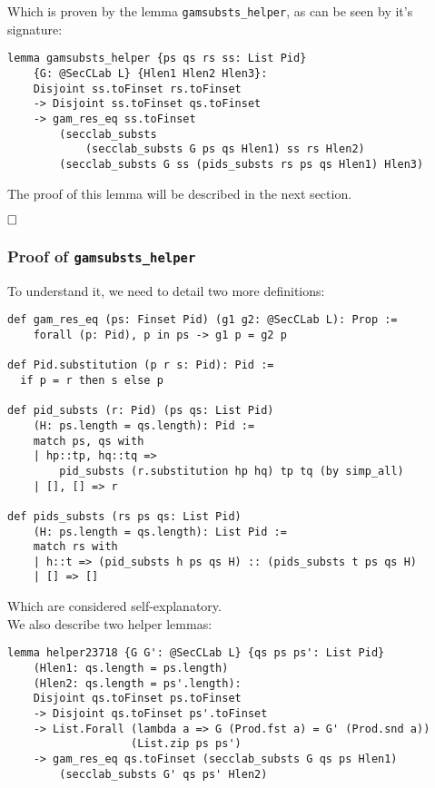 \documentclass[12pt,a4paper,twoside]{book}
\newcommand{\qed}{\hfill\square}
\begin{document}
\begin{itemize}
Which is proven by the lemma \texttt{gamsubsts\_helper}, as can be seen by it's signature:
\begin{samepage}
\begin{verbatim}
lemma gamsubsts_helper {ps qs rs ss: List Pid}
    {G: @SecCLab L} {Hlen1 Hlen2 Hlen3}:
    Disjoint ss.toFinset rs.toFinset
    -> Disjoint ss.toFinset qs.toFinset
    -> gam_res_eq ss.toFinset
        (secclab_substs
            (secclab_substs G ps qs Hlen1) ss rs Hlen2)
        (secclab_substs G ss (pids_substs rs ps qs Hlen1) Hlen3)
\end{verbatim}
\end{samepage}
The proof of this lemma will be described in the next section.
\end{itemize}
$\qed$

\subsubsection{Proof of \texttt{gamsubsts\_helper}}
To understand it, we need to detail two more definitions:
\begin{samepage}
\begin{verbatim}
def gam_res_eq (ps: Finset Pid) (g1 g2: @SecCLab L): Prop :=
    forall (p: Pid), p in ps -> g1 p = g2 p

def Pid.substitution (p r s: Pid): Pid :=
  if p = r then s else p

def pid_substs (r: Pid) (ps qs: List Pid)
    (H: ps.length = qs.length): Pid :=
    match ps, qs with
    | hp::tp, hq::tq =>
        pid_substs (r.substitution hp hq) tp tq (by simp_all)
    | [], [] => r

def pids_substs (rs ps qs: List Pid)
    (H: ps.length = qs.length): List Pid :=
    match rs with
    | h::t => (pid_substs h ps qs H) :: (pids_substs t ps qs H)
    | [] => []
\end{verbatim}
\end{samepage}
Which are considered self-explanatory.\\
We also describe two helper lemmas:
\begin{samepage}
\begin{verbatim}
lemma helper23718 {G G': @SecCLab L} {qs ps ps': List Pid}
    (Hlen1: qs.length = ps.length)
    (Hlen2: qs.length = ps'.length):
    Disjoint qs.toFinset ps.toFinset
    -> Disjoint qs.toFinset ps'.toFinset
    -> List.Forall (lambda a => G (Prod.fst a) = G' (Prod.snd a))
                   (List.zip ps ps')
    -> gam_res_eq qs.toFinset (secclab_substs G qs ps Hlen1)
        (secclab_substs G' qs ps' Hlen2)
\end{verbatim}
\end{samepage}
\end{document}

